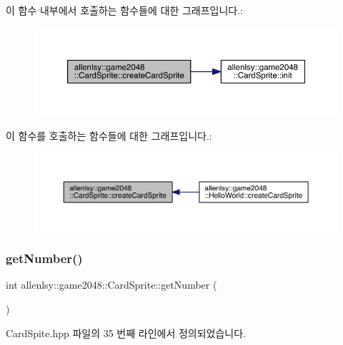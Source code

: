 이 함수 내부에서 호출하는 함수들에 대한 그래프입니다.\+:
\nopagebreak
\begin{figure}[H]
\begin{center}
\leavevmode
\includegraphics[width=350pt]{classallenlsy_1_1game2048_1_1_card_sprite_a3a14745470040dfb933397ccb83344d7_cgraph}
\end{center}
\end{figure}
이 함수를 호출하는 함수들에 대한 그래프입니다.\+:
\nopagebreak
\begin{figure}[H]
\begin{center}
\leavevmode
\includegraphics[width=350pt]{classallenlsy_1_1game2048_1_1_card_sprite_a3a14745470040dfb933397ccb83344d7_icgraph}
\end{center}
\end{figure}
\mbox{\label{classallenlsy_1_1game2048_1_1_card_sprite_ac483e81f56c1c7d08a83175061c8edb5}} 
\subsubsection{\texorpdfstring{get\+Number()}{getNumber()}}
{\footnotesize\ttfamily int allenlsy\+::game2048\+::\+Card\+Sprite\+::get\+Number (\begin{DoxyParamCaption}{ }\end{DoxyParamCaption})\hspace{0.3cm}{\ttfamily [inline]}}



Card\+Spite.\+hpp 파일의 35 번째 라인에서 정의되었습니다.

